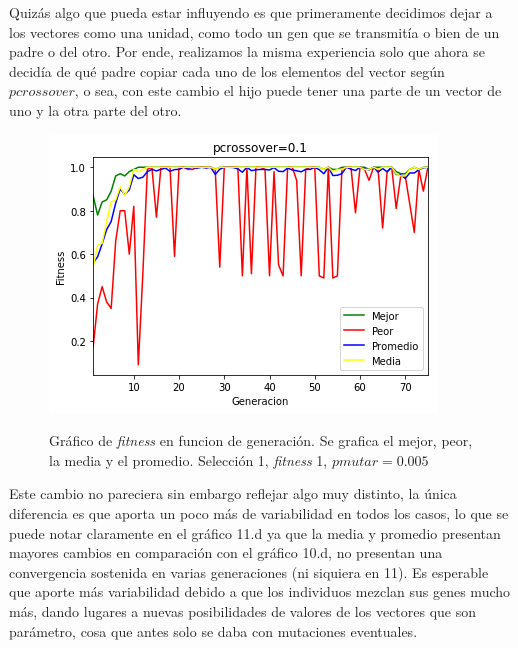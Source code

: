 \documentclass[A4paper,oneside,fleqn,11pt]{article}
\theoremstyle{definition}
\begin{document}
Quizás algo que pueda estar influyendo es que primeramente decidimos dejar a los vectores como una unidad, como todo un gen que se transmitía o bien de un padre o del otro. Por ende, realizamos la misma experiencia solo que ahora se decidía de qué padre copiar cada uno de los elementos del vector según $pcrossover$, o sea, con este cambio el hijo puede tener una parte de un vector de uno y la otra parte del otro.

\begin{figure}[H]
	\captionsetup[subfigure]{position=b}
	\centering
		{\includegraphics[width=0.3\linewidth]{crossoverB1.png}}
	\caption{Gráfico de \textit{fitness} en funcion de generación. Se grafica el mejor, peor, la media y el promedio. Selección 1, \textit{fitness} 1, $pmutar=0.005$}
\end{figure}

Este cambio no pareciera sin embargo reflejar algo muy distinto, la única diferencia es que aporta un poco más de variabilidad en todos los casos, lo que se puede notar claramente en el gráfico 11.d ya que la media y promedio presentan mayores cambios en comparación con el gráfico 10.d, no presentan una convergencia sostenida en varias generaciones (ni siquiera en 11). Es esperable que aporte más variabilidad debido a que los individuos mezclan sus genes mucho más, dando lugares a nuevas posibilidades de valores de los vectores que son parámetro, cosa que antes solo se daba con mutaciones eventuales.
\end{document}
